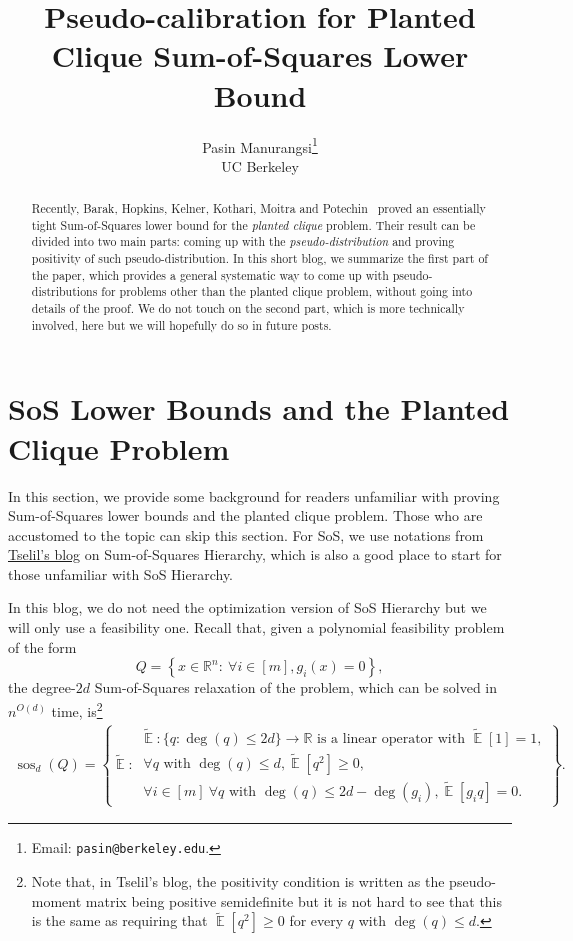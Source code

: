 \documentclass{article}[11pt]
\title{Pseudo-calibration for Planted Clique Sum-of-Squares Lower Bound}
\author{
Pasin Manurangsi\thanks{Email: \texttt{pasin@berkeley.edu}.} \vspace{-0.5em}\\
UC Berkeley
}
\DeclareMathOperator{\sos}{sos}
\newcommand{\E}{\mathop{\mathbb{E}}}
\newcommand{\tE}{\tilde{\E}}
\let\Oldforall\forall
\renewcommand{\forall}{~\Oldforall} %
\newcounter{section-preserve}
\begin{document}
\maketitle

\begin{abstract}
 Recently, Barak, Hopkins, Kelner, Kothari, Moitra and Potechin~\cite{BHKKMP16} proved an essentially tight Sum-of-Squares lower bound for the \emph{planted clique} problem. Their result can be divided into two main parts: coming up with the \emph{pseudo-distribution} and proving positivity of such pseudo-distribution. In this short blog, we summarize the first part of the paper, which provides a general systematic way to come up with pseudo-distributions for problems other than the planted clique problem, without going into details of the proof. We do not touch on the second part, which is more technically involved, here but we will hopefully do so in future posts.
\end{abstract}

\section{SoS Lower Bounds and the Planted Clique Problem}

In this section, we provide some background for readers unfamiliar with proving Sum-of-Squares lower bounds and the planted clique problem. Those who are accustomed to the topic can skip this section. For SoS, we use notations from \href{http://learningwitherrors.org/2016/06/23/intro-sos/}{Tselil's blog} on Sum-of-Squares Hierarchy, which is also a good place to start for those unfamiliar with SoS Hierarchy.

In this blog, we do not need the optimization version of SoS Hierarchy but we will only use a feasibility one. Recall that, given a polynomial feasibility problem of the form $$Q = \left\{x \in \mathbb{R}^n : \forall i \in [m], g_i(x) = 0\right\},$$ the degree-$2d$ Sum-of-Squares relaxation of the problem, which can be solved in $n^{O(d)}$ time, is\footnote{Note that, in Tselil's blog, the positivity condition is written as the pseudo-moment matrix being positive semidefinite but it is not hard to see that this is the same as requiring that $\tE[q^2] \geq 0$ for every $q$ with $\deg(q) \leq d$.}
\begin{align} \label{eq:sos}
\sos_d(Q) = \left\{\tE :
  \begin{array}{lr}
      {\tE}: \{q: \deg(q) \leq 2d\} \rightarrow \mathbb{R} \text{ is a linear operator with } \tE[1] = 1, \\
    \forall q \text{ with } \deg(q) \leq d, \tE[q^2] \geq 0, \\
    \forall i \in [m] \forall q \text{ with } \deg(q) \leq 2d - \deg(g_i), \tE[g_i q] = 0.
  \end{array}
  \right\}.
\end{align}
\end{document}
